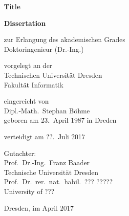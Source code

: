 \pagestyle{empty}

\begin{titlepage}
    \begin{center}
        \textbf{\textsf{\huge Title}}\\
        \bigskip\bigskip\bigskip


        \Large
        \textbf{Dissertation}\\
        \bigskip\bigskip

        zur Erlangung des akademischen Grades\\
        Doktoringenieur (Dr.-Ing.)\\
        \bigskip\bigskip

        vorgelegt an der\\
        Technischen Universität Dresden\\
        Fakultät Informatik\\
        \bigskip\bigskip

        eingereicht von\\
        Dipl.-Math.\ Stephan Böhme\\
        geboren am 23.\ April 1987 in Dreden\\
        \bigskip\bigskip

        verteidigt am {??.\ Juli 2017}\\
        \vfill

        Gutachter:\\
        Prof.\ Dr.-Ing.\ Franz Baader\\
        Technische Universität Dresden\\[1ex]
        Prof.\ Dr.\ rer.\ nat.\ habil.\ ??? ?????\\
        University of ???

        \bigskip\bigskip

        Dresden, im April 2017
    \end{center}
\end{titlepage}

\cleardoublepage

\pagestyle{scrheadings}


\tableofcontents

